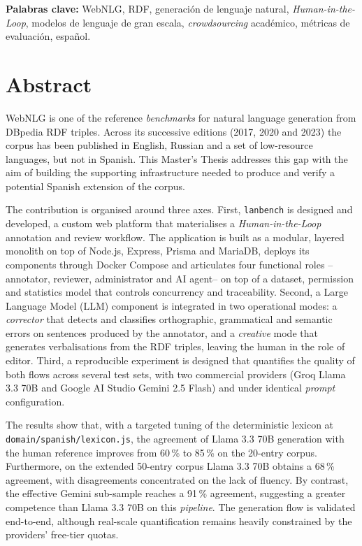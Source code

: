 \vspace{1em}
\noindent\textbf{Palabras clave:} WebNLG, RDF, generación de lenguaje natural,
\textit{Human-in-the-Loop}, modelos de lenguaje de gran escala,
\textit{crowdsourcing} académico, métricas de evaluación, español.

\newpage

\chapter*{Abstract}

WebNLG is one of the reference \textit{benchmarks} for natural language
generation from DBpedia RDF triples. Across its successive editions (2017, 2020
and 2023) the corpus has been published in English, Russian and a set of
low-resource languages, but not in Spanish. This Master's Thesis addresses this
gap with the aim of building the supporting infrastructure needed to produce
and verify a potential Spanish extension of the corpus.

The contribution is organised around three axes. First, \texttt{lanbench} is
designed and developed, a custom web platform that materialises a
\textit{Human-in-the-Loop} annotation and review workflow. The application is
built as a modular, layered monolith on top of Node.js, Express, Prisma and
MariaDB, deploys its components through Docker Compose and articulates four
functional roles --annotator, reviewer, administrator and AI agent-- on top of
a dataset, permission and statistics model that controls concurrency and
traceability. Second, a Large Language Model (LLM) component is integrated in
two operational modes: a \textit{corrector} that detects and classifies
orthographic, grammatical and semantic errors on sentences produced by the
annotator, and a \textit{creative} mode that generates verbalisations from the
RDF triples, leaving the human in the role of editor. Third, a reproducible
experiment is designed that quantifies the quality of both flows across several
test sets, with two commercial providers (Groq Llama 3.3 70B and Google AI
Studio Gemini 2.5 Flash) and under identical \textit{prompt} configuration.

The results show that, with a targeted tuning of the deterministic lexicon at
\texttt{domain/\allowbreak spanish/\allowbreak lexicon.js}, the agreement of Llama 3.3 70B generation
with the human reference improves from 60\,\% to 85\,\% on the 20-entry corpus.
Furthermore, on the extended 50-entry corpus Llama 3.3 70B obtains a 68\,\%
agreement, with disagreements concentrated on the lack of fluency. By contrast,
the effective Gemini sub-sample reaches a 91\,\% agreement, suggesting a
greater competence than Llama 3.3 70B on this \textit{pipeline}. The generation
flow is validated end-to-end, although real-scale quantification remains
heavily constrained by the providers' free-tier quotas.

